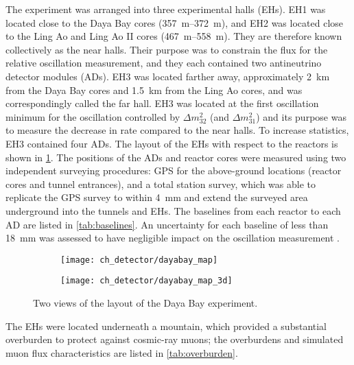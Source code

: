 The experiment was arranged into three experimental halls (EHs).
EH1 was located close to the Daya Bay cores (\SIrange{357}{372}{\meter}),
and EH2 was located close to the Ling Ao and Ling Ao II cores
(\SIrange{467}{558}{\meter}).
They are therefore known collectively as the near halls.
Their purpose was to constrain the \nuebar{} flux for the
relative oscillation measurement,
and they each contained two antineutrino detector modules (ADs).
EH3 was located farther away, approximately \SI{2}{\km} from the Daya Bay cores
and \SI{1.5}{\km} from the Ling Ao cores,
and was correspondingly called the far hall.
EH3 was located at the first oscillation minimum
for the oscillation controlled by $\Delta m^2_{32}$ (and $\Delta m^2_{31}$)
and its purpose was to measure the decrease in \nuebar{} rate compared to the near halls.
To increase statistics, EH3 contained four ADs.
The layout of the EHs with respect to the reactors is shown in \cref{fig:layout}.
The positions of the ADs and reactor cores were measured using
two independent surveying procedures: GPS for the above-ground locations
(reactor cores and tunnel entrances),
and a total station survey,
which was able to replicate the GPS survey to within \SI{4}{\mm}
and extend the surveyed area underground into the tunnels and EHs.
The baselines from each reactor to each AD are listed in \cref{tab:baselines}.
An uncertainty for each baseline of less than \SI{18}{\mm}
was assessed to have negligible impact on the oscillation measurement
\cite{detector_system}.

\begin{figure}
    \centering
    \begin{subfigure}{0.49\textwidth}
        \texttt{[image: ch\_detector/dayabay\_map]}
    \end{subfigure}
    \begin{subfigure}{0.49\textwidth}
        \texttt{[image: ch\_detector/dayabay\_map\_3d]}
    \end{subfigure}
    \caption[Daya Bay geographic layout]{Two views of the layout of the Daya Bay experiment.}
    \label{fig:layout}
\end{figure}

The EHs were located underneath a mountain, which provided a substantial
overburden to protect against cosmic-ray muons;
the overburdens and simulated muon flux characteristics
are listed in \cref{tab:overburden}.

